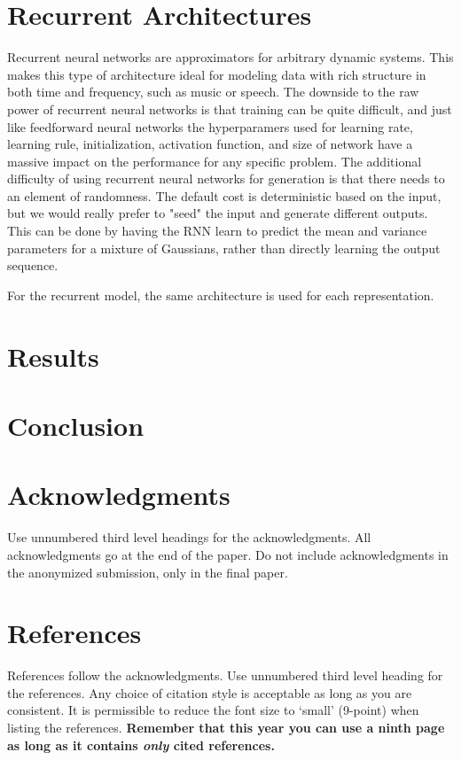 \documentclass{article} %
\begin{document}
\section{Recurrent Architectures}
Recurrent neural networks are approximators for arbitrary dynamic systems.
This makes this type of architecture ideal for modeling data with rich
structure in both time and frequency, such as music or speech. The downside
to the raw power of recurrent neural networks is that training can be quite
difficult, and just like feedforward neural networks the hyperparamers
used for learning rate, learning rule, initialization, activation function, and
size of network have a massive impact on the performance for any specific
problem. The additional difficulty of using recurrent neural networks for
generation is that there needs to an element of randomness. The default cost
is deterministic based on the input, but we would really prefer to "seed" the
input and generate different outputs. This can be done by having the RNN learn
to predict the mean and variance parameters for a mixture of Gaussians,
rather than directly learning the output sequence. 
\par
For the recurrent model, the same architecture is used for each
representation. 
\section{Results}
\section{Conclusion}

\section*{Acknowledgments}

Use unnumbered third level headings for the acknowledgments. All
acknowledgments go at the end of the paper. Do not include 
acknowledgments in the anonymized submission, only in the 
final paper. 

\section*{References}

References follow the acknowledgments. Use unnumbered third level heading for
the references. Any choice of citation style is acceptable as long as you are
consistent. It is permissible to reduce the font size to `small' (9-point) 
when listing the references. {\bf Remember that this year you can use
a ninth page as long as it contains \emph{only} cited references.}
\end{document}

